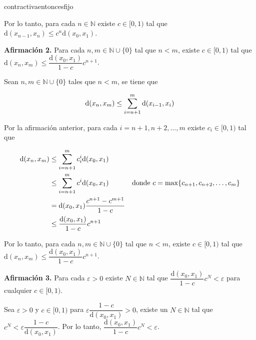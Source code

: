 \documentclass[12pt]{article}
\newenvironment{ejercicio}[1]{\begin{ejer}[breakable, pad at break = 5mm, leftrule = 0.7mm, rightrule = 0.7mm, right = 2mm, left = 2mm, enlarge bottom finally by = 3mm, fontlower = \setlength{\parskip}{2mm}]{}{#1}}{\end{ejer}}
\newcommand{\nat}{\mathbb{N}}
\begin{document}
\begin{ejercicio}{contractivaentoncesfijo}
\begin{minipage}{0.98\linewidth}
			Por lo tanto, para cada $ n \in \nat $ existe $ c \in [0,1) $ tal que $ \mathrm{d} (x_{n-1}, x_n) \leq c^n \mathrm{d} (x_0, x_1) $.
		\end{minipage}

		\textbf{Afirmación 2.} Para cada $ n, m \in \nat \cup \lbrace 0 \rbrace $ tal que $ n < m $, existe $ c \in [0,1) $ tal que \\ $ \mathrm{d} (x_n, x_m) \leq \dfrac{\mathrm{d} (x_0, x_1)}{1-c} c^{n+1} $. 

		\hfill \begin{minipage}{0.98\linewidth}
			\setlength{\parskip}{1mm}

			Sean $ n, m \in \nat \cup \lbrace 0 \rbrace $ tales que $ n < m $, se tiene que

			\begin{equation*}
				\mathrm{d} (x_n, x_m) \leq \sum_{i=n+1}^{m} \mathrm{d} (x_{i-1}, x_i) \\
			\end{equation*}

			Por la afirmación anterior, para cada $ i = n+1, n+2, \ldots, m $ existe $ c_i \in [0,1) $ tal que 
			
			\begin{align*}
				\mathrm{d} (x_n, x_m) &\leq \sum_{i=n+1}^{m} c_i^i \mathrm{d} (x_0, x_1) & \\
				&\leq \sum_{i=n+1}^{m} c^i \mathrm{d} (x_0, x_1) & \mbox{donde $ c = \max \{ c_{n+1}, c_{n+2}, \ldots, c_m \} $} \\
				&= \mathrm{d} (x_0, x_1) \dfrac{c^{n+1}-c^{m+1}}{1-c} & \\
				&\leq \dfrac{\mathrm{d} (x_0, x_1)}{1-c} c^{n+1} &
			\end{align*}

			Por lo tanto, para cada $ n, m \in \nat \cup \lbrace 0 \rbrace $ tal que $ n < m $, existe $ c \in [0,1) $ tal que \\ $ \mathrm{d} (x_n, x_m) \leq \dfrac{\mathrm{d} (x_0, x_1)}{1-c} c^{n+1} $. 
		\end{minipage}

		\textbf{Afirmación 3.} Para cada $ \varepsilon > 0 $ existe $ N \in \nat $ tal que $ \dfrac{\mathrm{d} (x_0, x_1)}{1-c} c^N < \varepsilon $ para cualquier $ c \in [0,1) $. 

		\hfill \begin{minipage}{0.98\linewidth}
			\setlength{\parskip}{1mm}

			Sea $ \varepsilon > 0 $ y $ c \in [0,1) $ para $ \varepsilon \dfrac{1-c}{\mathrm{d} (x_0, x_1)} > 0 $, existe un $ N \in \nat $ tal que $ c^N < \varepsilon \dfrac{1-c}{\mathrm{d} (x_0, x_1)} $. Por lo tanto, $ \dfrac{\mathrm{d} (x_0, x_1)}{1-c} c^N < \varepsilon $. 
		\end{minipage}


\end{ejercicio}
\end{document}
